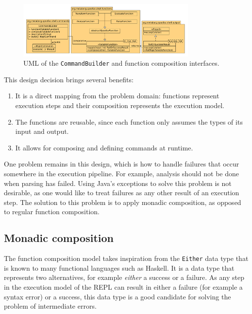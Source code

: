 \begin{figure}[b]
  \centering
  \includegraphics[width=0.8\textwidth]{uml-function-comp}
  \caption{UML of the \texttt{CommandBuilder} and function composition
    interfaces.}
  \label{fig:uml-function-comp}
\end{figure}

This design decision brings several benefits:

\begin{enumerate}
\item It is a direct mapping from the problem domain: functions
  represent execution steps and their composition represents the
  execution model.
\item The functions are reusable, since each function only assumes
  the types of its input and output.
\item It allows for composing and defining commands at runtime.
\end{enumerate}

One problem remains in this design, which is how to handle failures that occur
somewhere in the execution pipeline. For example, analysis should not be
done when parsing has failed. Using Java's exceptions to solve this problem
is not desirable, as one would like to treat failures as any other result of an
execution step. The solution to this problem is to apply monadic composition, as
opposed to regular function composition.

\subsection{Monadic composition}
\label{sec:monadic-composition}
The function composition model takes inspiration from the \texttt{Either}
data type that is known to many functional languages such as
Haskell. It is a data type that represents two alternatives, for
example \textit{either} a success or a failure. As any step in the
execution model of the REPL can result in either a failure (for
example a syntax error) or a success, this data type is a good
candidate for solving the problem of intermediate errors.

